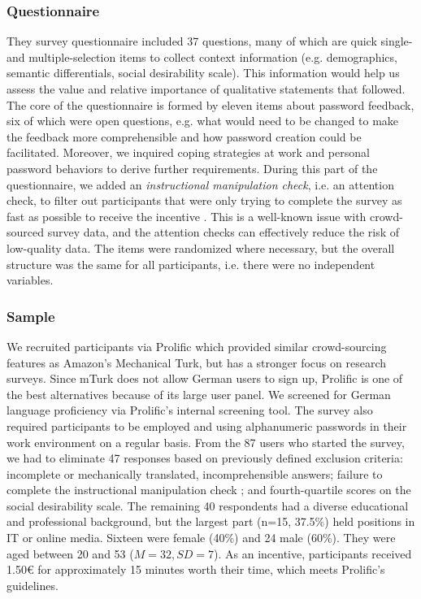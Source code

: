 \subsubsection{Questionnaire}
They survey questionnaire included 37 questions, many of which are quick single- and multiple-selection items to collect context information (e.g. demographics, semantic differentials, social desirability scale). This information would help us assess the value and relative importance of qualitative statements that followed. The core of the questionnaire is formed by eleven items about password feedback, six of which were open questions, e.g. what would need to be changed to make the feedback more comprehensible and how password creation could be facilitated. Moreover, we inquired coping strategies at work and personal password behaviors to derive further requirements. During this part of the questionnaire, we added an \textit{instructional manipulation check}, i.e. an attention check, to filter out participants that were only trying to complete the survey as fast as possible to receive the incentive \cite{Oppenheimer2009InstructionalManipulationChecks}. This is a well-known issue with crowd-sourced survey data, and the attention checks can effectively reduce the risk of low-quality data. The items were randomized where necessary, but the overall structure was the same for all participants, i.e. there were no independent variables. 

\subsubsection{Sample}
We recruited participants via Prolific  which provided similar crowd-sourcing features as Amazon's Mechanical Turk, but has a stronger focus on research surveys. Since \gls{mTurk} does not allow German users to sign up, Prolific is one of the best alternatives because of its large user panel. We screened for German language proficiency via Prolific's internal screening tool. The survey also required participants to be employed and using alphanumeric passwords in their work environment on a regular basis. 
From the 87 users who started the survey, we had to eliminate 47 responses based on previously defined exclusion criteria: incomplete or mechanically translated, incomprehensible answers; failure to complete the instructional manipulation check \cite{Oppenheimer2009InstructionalManipulationChecks}; and fourth-quartile scores on the social desirability scale. The remaining 40 respondents had a diverse educational and professional background, but the largest part (n=15, 37.5\%) held positions in IT or online media. Sixteen were female (40\%) and 24 male (60\%). They were aged between 20 and 53 ($M=32, SD=7$). As an incentive, participants received 1.50€ for approximately 15 minutes worth their time, which meets Prolific's guidelines. 

